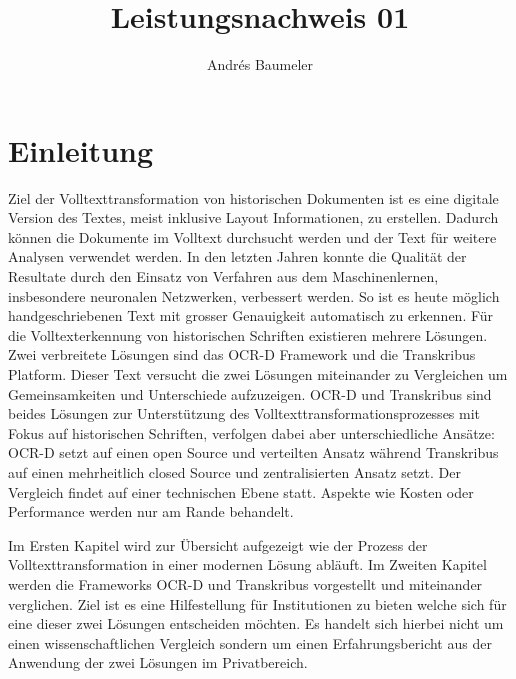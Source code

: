 \documentclass[a4paper,oneside, 12pt]{report}
\title{Leistungsnachweis 01}
\author{Andrés Baumeler}
\begin{document}

\pagestyle{empty} %





\cleardoublepage
\tableofcontents %
\cleardoublepage %

\pagestyle{plain} %



\chapter{Einleitung}\label{sec:motivation}
Ziel der Volltexttransformation von historischen Dokumenten ist es eine digitale Version des Textes, meist inklusive Layout Informationen, zu erstellen. Dadurch können die Dokumente im Volltext durchsucht werden und der Text für weitere Analysen verwendet werden. In den letzten Jahren konnte die Qualität der Resultate durch den Einsatz von Verfahren aus dem Maschinenlernen, insbesondere neuronalen Netzwerken, verbessert werden. So ist es heute möglich handgeschriebenen Text mit grosser Genauigkeit automatisch zu erkennen. 
Für die Volltexterkennung von historischen Schriften existieren mehrere Lösungen. Zwei verbreitete Lösungen sind das OCR-D Framework und die Transkribus Platform. Dieser Text versucht die zwei Lösungen miteinander zu Vergleichen um Gemeinsamkeiten und Unterschiede aufzuzeigen. OCR-D und Transkribus sind beides Lösungen zur Unterstützung des Volltexttransformationsprozesses mit Fokus auf historischen Schriften, verfolgen dabei aber unterschiedliche Ansätze: OCR-D setzt auf einen open Source und verteilten Ansatz während Transkribus auf einen mehrheitlich closed Source und zentralisierten Ansatz setzt. Der Vergleich findet auf einer technischen Ebene statt. Aspekte wie Kosten oder Performance werden nur am Rande behandelt.

Im Ersten Kapitel wird zur Übersicht aufgezeigt wie der Prozess der Volltexttransformation in einer modernen Lösung abläuft. Im Zweiten Kapitel werden die Frameworks OCR-D und Transkribus vorgestellt und miteinander verglichen. Ziel ist es eine Hilfestellung für Institutionen zu bieten welche sich für eine dieser zwei Lösungen entscheiden möchten. Es handelt sich hierbei nicht um einen wissenschaftlichen Vergleich sondern um einen Erfahrungsbericht aus der Anwendung der zwei Lösungen im Privatbereich. 
\end{document}
